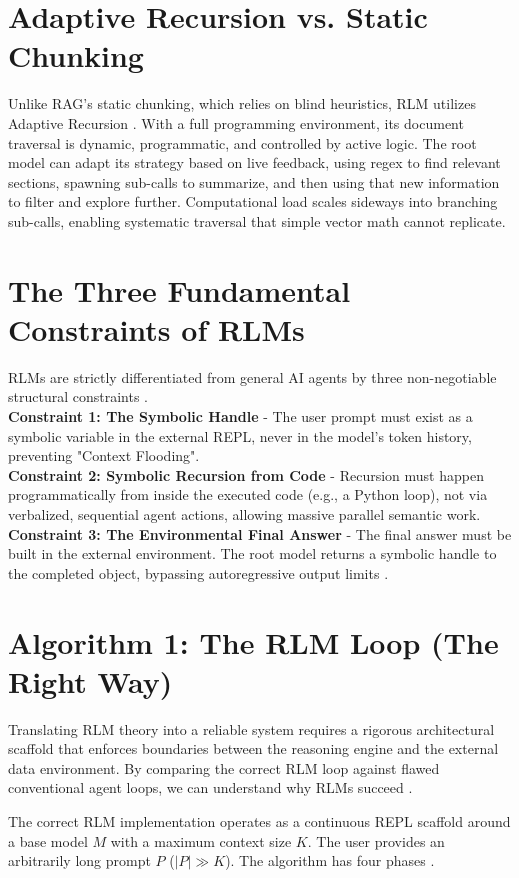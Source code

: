 \section{Adaptive Recursion vs. Static Chunking}
Unlike RAG's static chunking, which relies on blind heuristics, RLM utilizes Adaptive Recursion \cite{lewis2020, zhang2025}. With a full programming environment, its document traversal is dynamic, programmatic, and controlled by active logic. The root model can adapt its strategy based on live feedback, using regex to find relevant sections, spawning sub-calls to summarize, and then using that new information to filter and explore further. Computational load scales sideways into branching sub-calls, enabling systematic traversal that simple vector math cannot replicate.


\section{The Three Fundamental Constraints of RLMs}
\noindent RLMs are strictly differentiated from general AI agents by three non-negotiable structural constraints \cite{zhang2025}. \\
\textbf{Constraint 1: The Symbolic Handle} - The user prompt must exist as a symbolic variable in the external REPL, never in the model's token history, preventing "Context Flooding". \\
\textbf{Constraint 2: Symbolic Recursion from Code} - Recursion must happen programmatically from inside the executed code (e.g., a Python loop), not via verbalized, sequential agent actions, allowing massive parallel semantic work. \\
\textbf{Constraint 3: The Environmental Final Answer} - The final answer must be built in the external environment. The root model returns a symbolic handle to the completed object, bypassing autoregressive output limits \cite{packer2024}.


\section{Algorithm 1: The RLM Loop (The Right Way)}
Translating RLM theory into a reliable system requires a rigorous architectural scaffold that enforces boundaries between the reasoning engine and the external data environment. By comparing the correct RLM loop against flawed conventional agent loops, we can understand why RLMs succeed \cite{zhang2025}.

The correct RLM implementation operates as a continuous REPL scaffold around a base model $M$ with a maximum context size $K$. The user provides an arbitrarily long prompt $P$ ($|P| \gg K$). The algorithm has four phases \cite{zhang2025}.



